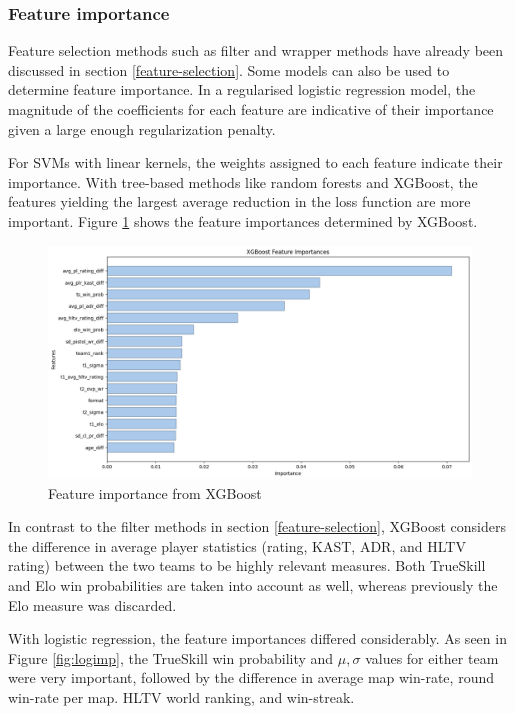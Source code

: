 \subsubsection{Feature importance}

Feature selection methods such as filter and wrapper methods have already been discussed in section \ref{feature-selection}. Some models can also be used to determine feature importance. In a regularised logistic regression model, the magnitude of the coefficients for each feature are indicative of their importance given a large enough regularization penalty. 

For SVMs with linear kernels, the weights assigned to each feature indicate their importance. With tree-based methods like random forests and XGBoost, the features yielding the largest average reduction in the loss function are more important. Figure \ref{fig:xgbimp} shows the feature importances determined by XGBoost.

\begin{figure}[h]
	\centering
	\begin{adjustbox}{center}
		\includegraphics[width=1.3\textwidth]{Figures/xgb-imp.png}
	\end{adjustbox}
	\caption{Feature importance from XGBoost}
	\label{fig:xgbimp}
\end{figure}

In contrast to the filter methods in section \ref{feature-selection}, XGBoost considers the difference in average player statistics (rating, KAST, ADR, and HLTV rating) between the two teams to be highly relevant measures. Both TrueSkill and Elo win probabilities are taken into account as well, whereas previously the Elo measure was discarded. 

With logistic regression, the feature importances differed considerably. As seen in Figure \ref{fig:logimp}, the TrueSkill win probability and $\mu,\sigma$ values for either team were very important, followed by the difference in average map win-rate, round win-rate per map. HLTV world ranking, and win-streak.

